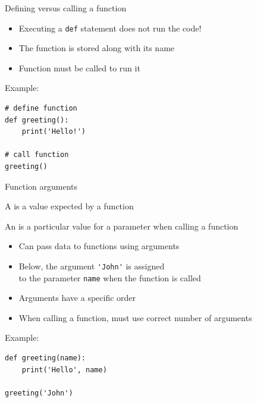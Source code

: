 \documentclass[aspectratio=169,usenames,dvipsnames]{beamer}
\begin{document}
\begin{frame}[fragile]{Defining versus calling a function}
    \begin{itemize}
        \item Executing a \lstinline{def}
            statement does not run the code!
        \item The function is stored along with its name
        \item Function must be called to run it
    \end{itemize}
    Example:
\begin{lstlisting}
# define function
def greeting():
    print('Hello!')

# call function
greeting()
\end{lstlisting}
\end{frame}

\begin{frame}[fragile]{Function arguments}
    \begin{definition}
        A  is a value expected by a function

        An  is a particular value for a parameter
            when calling a function
    \end{definition}

    \begin{itemize}
        \item Can pass data to functions using arguments
        \item Below, the argument \lstinline{'John'} is assigned \\
            to the parameter \lstinline{name} when the function is called
        \item Arguments have a specific order
        \item When calling a function, must use correct number of arguments
    \end{itemize}
Example:
\begin{lstlisting}
def greeting(name):
    print('Hello', name)

greeting('John')
\end{lstlisting}
\end{frame}
\end{document}
